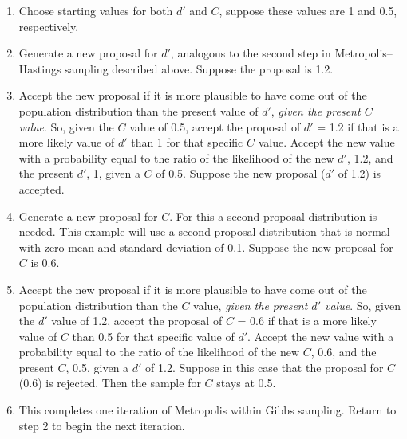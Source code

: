 \begin{enumerate}
	\item{} Choose starting values for both $d'$ and $C$, suppose these values are 1 and 0.5, respectively.
	\item{} Generate a new proposal for $d'$, analogous to the second step in Metropolis--Hastings sampling described above. Suppose the proposal is 1.2.
	\item{} Accept the new proposal if it is more plausible to have come out of the population distribution than the present value of $d'$, \emph{given the present $C$ value}. So, given the $C$ value of 0.5, accept the proposal of $d'$ = 1.2 if that is a more likely value of $d'$ than 1 for that specific $C$ value. Accept the new value with a probability equal to the ratio of the likelihood of the new $d'$, 1.2, and the present $d'$, 1, given a $C$ of 0.5. Suppose the new proposal ($d'$ of 1.2) is accepted.
	\item{} Generate a new proposal for $C$. For this a second proposal distribution is needed. This example will use a second proposal distribution that is normal with zero mean and standard deviation of 0.1. Suppose the new proposal for $C$ is 0.6.
	\item{} Accept the new proposal if it is more plausible to have come out of the population distribution than the $C$ value, \emph{given the present $d'$ value}. So, given the $d'$ value of 1.2, accept the proposal of $C$ = 0.6 if that is a more likely value of $C$ than 0.5 for that specific value of $d'$. Accept the new value with a probability equal to the ratio of the likelihood of the new $C$, 0.6, and the present $C$, 0.5, given a $d'$ of 1.2. Suppose in this case that the proposal for $C$ (0.6) is rejected. Then the sample for $C$ stays at 0.5.
	\item{} This completes one iteration of Metropolis within Gibbs sampling. Return to step 2 to begin the next iteration.
\end{enumerate}

